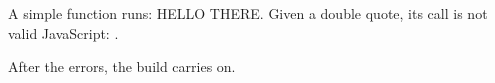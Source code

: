 A simple function runs: HELLO THERE. Given a double quote, its call is
not valid JavaScript: .

After the errors, the build carries on.

